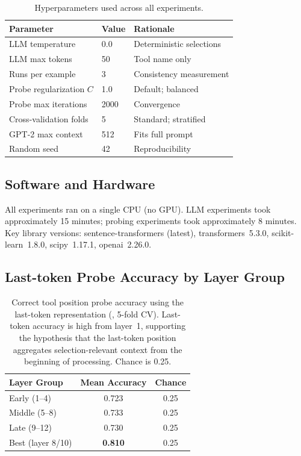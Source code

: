 \begin{table}[h]
\centering
\caption{Hyperparameters used across all experiments.}
\label{tab:hyperparams}
\renewcommand{\arraystretch}{1.1}
\begin{tabular}{@{}lll@{}}
\toprule
\textbf{Parameter} & \textbf{Value} & \textbf{Rationale} \\
\midrule
LLM temperature            & 0.0    & Deterministic selections \\
LLM max tokens             & 50     & Tool name only \\
Runs per example           & 3      & Consistency measurement \\
Probe regularization $C$   & 1.0    & Default; balanced \\
Probe max iterations       & 2000   & Convergence \\
Cross-validation folds     & 5      & Standard; stratified \\
GPT-2 max context          & 512    & Fits full prompt \\
Random seed                & 42     & Reproducibility \\
\bottomrule
\end{tabular}
\end{table}

\subsection{Software and Hardware}
\label{app:software}

All experiments ran on a single CPU (no GPU).  LLM experiments took approximately 15 minutes;
probing experiments took approximately 8 minutes.  Key library versions:
sentence-transformers (latest), transformers~5.3.0, scikit-learn~1.8.0, scipy~1.17.1,
openai~2.26.0.

\subsection{Last-token Probe Accuracy by Layer Group}
\label{app:lasttoken}

\begin{table}[h]
\centering
\caption{Correct tool position probe accuracy using the last-token representation
         (\gpttwo, 5-fold CV).  Last-token accuracy is high from layer~1, supporting
         the hypothesis that the last-token position aggregates selection-relevant context
         from the beginning of processing.  Chance is 0.25.}
\label{tab:probe_lasttoken}
\begin{tabular}{@{}lcc@{}}
\toprule
\textbf{Layer Group} & \textbf{Mean Accuracy} & \textbf{Chance} \\
\midrule
Early (1--4)       & 0.723 & 0.25 \\
Middle (5--8)      & 0.733 & 0.25 \\
Late (9--12)       & 0.730 & 0.25 \\
Best (layer 8/10)  & \textbf{0.810} & 0.25 \\
\bottomrule
\end{tabular}
\end{table}
